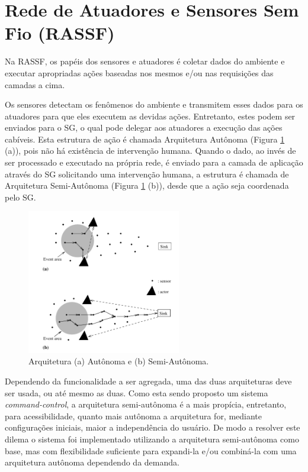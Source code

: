 \documentclass[12pt,a4paper,oneside]{report}
\begin{document}
\section{Rede de Atuadores e Sensores Sem Fio (RASSF)}

Na RASSF, os papéis dos sensores e atuadores é coletar dados do ambiente e executar apropriadas ações baseadas nos mesmos e/ou nas requisições das camadas a cima.

Os sensores detectam os fenômenos do ambiente e transmitem esses dados para os atuadores para que eles executem as devidas ações. Entretanto, estes podem ser enviados para o SG, o qual pode delegar aos atuadores a execução das ações cabíveis. Esta estrutura de ação é chamada Arquitetura Autônoma (Figura \ref{fig:arquitetura-autonoma} (a)), pois não há existência de intervenção humana. Quando o dado, ao invés de ser processado e executado na própria rede, é enviado para a camada de aplicação através do SG solicitando uma intervenção humana, a estrutura é chamada de Arquitetura Semi-Autônoma (Figura \ref{fig:arquitetura-autonoma} (b)), desde que a ação seja coordenada pelo SG.

\begin{figure}[htbp]
   \centering
    \includegraphics[width=0.6\textwidth]{figuras/figura_2_6}
    \caption{Arquitetura (a) Autônoma e (b) Semi-Autônoma.}
    \label{fig:arquitetura-autonoma}
\end{figure}

Dependendo da funcionalidade a ser agregada, uma das duas arquiteturas deve ser usada, ou até mesmo as duas. Como esta sendo proposto um sistema \emph{command-control}, a arquitetura semi-autônoma é a mais propícia, entretanto, para acessibilidade, quanto mais autônoma a arquitetura for, mediante configurações iniciais, maior a independência do usuário. De modo a resolver este dilema o sistema foi implementado utilizando a arquitetura semi-autônoma como base, mas com flexibilidade suficiente para expandi-la e/ou combiná-la com uma arquitetura autônoma dependendo da demanda.
\end{document}
